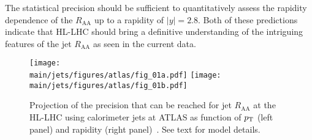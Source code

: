 The statistical precision should be sufficient to quantitatively assess the rapidity dependence of the $R_\mathrm{AA}$ up to a rapidity of $|y|=2.8$. Both of these predictions indicate that HL-LHC should bring a definitive understanding of the intriguing features of the jet $R_\mathrm{AA}$ as seen in the current data.
%
\begin{figure}[!ht]
\begin{center}
\texttt{[image: \\main/jets/figures/atlas/fig\_01a.pdf]}
\texttt{[image: \\main/jets/figures/atlas/fig\_01b.pdf]}
\caption{Projection of the precision that can be reached for jet $R_{\mathrm{AA}}$ at the HL-LHC using calorimeter jets at ATLAS as function of $p\sb{\scriptstyle\mathrm{T}}$ (left panel) and rapidity (right panel)~\cite{ATL-PHYS-PUB-2018-019}. See text for model details.}
\label{fig:jetRAA}
\end{center}
\end{figure}


